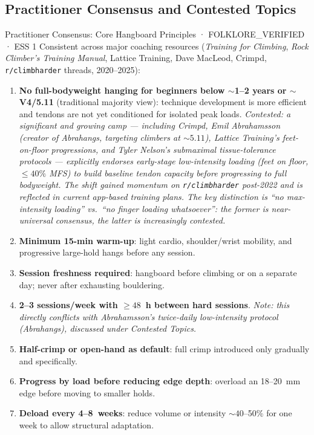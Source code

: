 \subsection{Practitioner Consensus and Contested Topics}
\label{sec:folklore}

\begin{folklorebox}{Practitioner Consensus: Core Hangboard Principles · FOLKLORE\_VERIFIED · ESS 1}
Consistent across major coaching resources (\textit{Training for Climbing}, \textit{Rock Climber's Training Manual}, Lattice Training, Dave MacLeod, Crimpd, \texttt{r/climbharder} threads, 2020--2025):
\begin{enumerate}[noitemsep, topsep=2pt]
  \item \textbf{No full-bodyweight hanging for beginners below ${\sim}$1--2 years or ${\sim}$V4/5.11} (traditional majority view): technique development is more efficient and tendons are not yet conditioned for isolated peak loads. \textit{Contested: a significant and growing camp — including Crimpd, Emil Abrahamsson (creator of Abrahangs, targeting climbers at ${\sim}5.11$), Lattice Training's feet-on-floor progressions, and Tyler Nelson's submaximal tissue-tolerance protocols — explicitly endorses early-stage low-intensity loading (feet on floor, $\leq40\%$ MFS) to build baseline tendon capacity before progressing to full bodyweight. The shift gained momentum on \texttt{r/climbharder} post-2022 and is reflected in current app-based training plans. The key distinction is ``no max-intensity loading'' vs.\ ``no finger loading whatsoever'': the former is near-universal consensus, the latter is increasingly contested.}
  \item \textbf{Minimum 15-min warm-up}: light cardio, shoulder/wrist mobility, and progressive large-hold hangs before any session.
  \item \textbf{Session freshness required}: hangboard before climbing or on a separate day; never after exhausting bouldering.
  \item \textbf{2--3 sessions/week with $\geq48$~h between hard sessions}. \textit{Note: this directly conflicts with Abrahamsson's twice-daily low-intensity protocol (Abrahangs), discussed under Contested Topics.}
  \item \textbf{Half-crimp or open-hand as default}: full crimp introduced only gradually and specifically.
  \item \textbf{Progress by load before reducing edge depth}: overload an 18--20~mm edge before moving to smaller holds.
  \item \textbf{Deload every 4--8~weeks}: reduce volume or intensity ${\sim}40$--50\% for one week to allow structural adaptation.
\end{enumerate}
\end{folklorebox}

